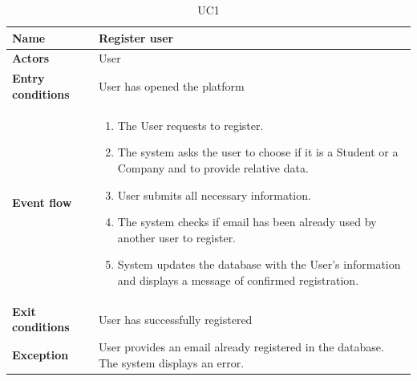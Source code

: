 \begin{table}[H]
\renewcommand\arraystretch{1.25}
    \centering
    \begin{tabular}{|l|p{12cm}|}
        \hline
        \textbf{Name} & Register user\\
        \hline
        \textbf{Actors} & User\\
        \hline
        \textbf{Entry conditions} & User has opened the platform\\
        \hline
        \textbf{Event flow} & 
        \begin{enumerate}
            \item The User requests to register.
            \item The system asks the user to choose if it is a Student or a Company and to provide relative data.
            \item User submits all necessary information.
            \item The system checks if email has been already used by another user to register.
            \item System updates the database with the User’s information and displays a message of confirmed registration. 
        \end{enumerate}\\
        \hline
        \textbf{Exit conditions} & User has successfully registered \\
        \hline
        \textbf{Exception} & User provides an email already registered in the database. The system displays an error.\\
        \hline
    \end{tabular}
    \caption{UC1}
    \label{UC1}
\end{table}

